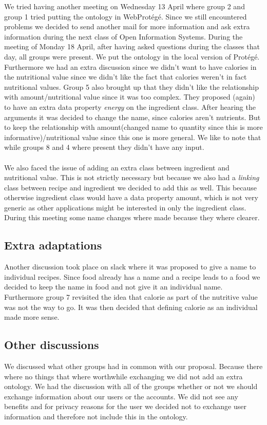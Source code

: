 \noindent
We tried having another meeting on Wednesday 13 April where group 2 and group 1 tried putting the ontology in WebProtégé. Since we still encountered problems we decided to send another mail for more information and ask extra information during the next class of Open Information Systems. 
\newline
\newline
\noindent
During the meeting of Monday 18 April, after having asked questions during the classes that day, all groups were present. We put the ontology in the local version of Protégé. Furthermore we had an extra discussion since we didn't want to have calories in the nutritional value since we didn't like the fact that calories weren't in fact nutritional values. Group 5 also brought up that they didn't like the relationship with amount/nutritional value since it was too complex. They proposed (again) to have an extra data property \emph{energy} on the ingredient class. After hearing the arguments it was decided to change the name, since calories aren't nutrients. But to keep the relationship with amount(changed name to quantity since this is more informative)/nutritional value since this one is more general. We like to note that while groups 8 and 4 where present they didn't have any input.\\ \\
We also faced the issue of adding an extra class between ingredient and nutritional value. This is not strictly necessary but because we also had a \emph{linking} class between recipe and ingredient we decided to add this as well. This because otherwise ingredient class would have a data property amount, which is not very generic as other applications might be interested in only the ingredient class. During this meeting some name changes where made because they where clearer.

\subsection{Extra adaptations} 
Another discussion took place on slack where it was proposed to give a name to individual recipes. Since food already has a name and a recipe leads to a food we decided to keep the name in food and not give it an individual name. Furthermore group 7 revisited the idea that calorie as part of the nutritive value was not the way to go. It was then decided that defining calorie as an individual made more sense.


\subsection{Other discussions}
We discussed what other groups had in common with our proposal. Because there where no things that where worthwhile exchanging we did not add an extra ontology.
\newline
\newline
\noindent
We had the discussion with all of the groups whether or not we should exchange information about our users or the accounts. We did not see any benefits and for privacy reasons for the user we decided not to exchange user information and therefore not include this in the ontology. 

